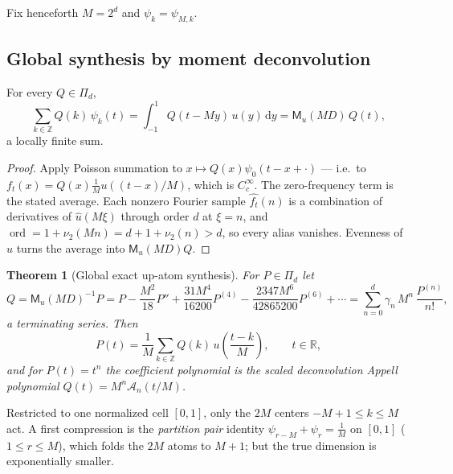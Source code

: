 \documentclass[11pt,oneside]{article}
\numberwithin{equation}{section}
\newtheorem{theorem}{Theorem}[section]
\theoremstyle{definition}
\theoremstyle{remark}
\newcommand{\R}{\mathbb R}
\newcommand{\Z}{\mathbb Z}
\newcommand{\dd}{\,\mathrm d}
\newcommand{\vtwo}{\nu_2}
\DeclareMathOperator{\ord}{ord}
\newcommand{\MM}{\mathsf M}
\newcommand{\Gd}{\mathcal A}
\newcommand{\PiD}{\Pi_d}
\begin{document}
Fix henceforth $M=2^{d}$ and $\psi_k=\psi_{M,k}$.

\subsection{Global synthesis by moment deconvolution}

\begin{lemma}
\label{lem:poisson-collapse}
For every $Q\in\PiD$,
\begin{equation}
 \sum_{k\in\Z}Q(k)\,\psi_k(t)
 =\int_{-1}^{1}Q(t-My)\,u(y)\dd y
 =\MM_u(MD)\,Q(t),
 \label{eq:poisson-collapse}
\end{equation}
a locally finite sum.
\end{lemma}

\begin{proof}
Apply Poisson summation to $x\mapsto Q(x)\psi_0(t-x+\cdot)$ --- i.e.\
to $f_t(x)=Q(x)\frac1Mu((t-x)/M)$, which is $C_c^\infty$.  The
zero-frequency term is the stated average.  Each nonzero Fourier
sample $\widehat{f_t}(n)$ is a combination of derivatives of
$\widehat u(M\xi)$ through order $d$ at $\xi=n$, and
$\ord=1+\vtwo(Mn)=d+1+\vtwo(n)>d$, so every alias vanishes.  Evenness
of $u$ turns the average into $\MM_u(MD)Q$.
\end{proof}

\begin{theorem}[Global exact up-atom synthesis]
\label{thm:global-synthesis}
For $P\in\PiD$ let
\begin{equation}
 Q=\MM_u(MD)^{-1}P
 =P-\frac{M^{2}}{18}P''
 +\frac{31M^{4}}{16200}P^{(4)}
 -\frac{2347M^{6}}{42865200}P^{(6)}+\cdots
 =\sum_{n=0}^{d}\gamma_n\,M^{n}\,\frac{P^{(n)}}{n!},
 \label{eq:Q-deconv}
\end{equation}
a terminating series.  Then
\begin{equation}
 \boxed{\;
 P(t)=\frac1M\sum_{k\in\Z}Q(k)\,
 u\!\left(\frac{t-k}{M}\right),
 \qquad t\in\R,
 \;}
 \label{eq:global-synthesis}
\end{equation}
and for $P(t)=t^{n}$ the coefficient polynomial is the scaled
deconvolution Appell polynomial
$Q(t)=M^{n}\Gd_n(t/M)$.
\end{theorem}

Restricted to one normalized cell $[0,1]$, only the $2M$ centers
$-M+1\le k\le M$ act.  A first compression is the \emph{partition
pair} identity $\psi_{r-M}+\psi_r=\tfrac1M$ on $[0,1]$
($1\le r\le M$), which folds the $2M$ atoms to $M+1$; but the true
dimension is exponentially smaller.
\end{document}
